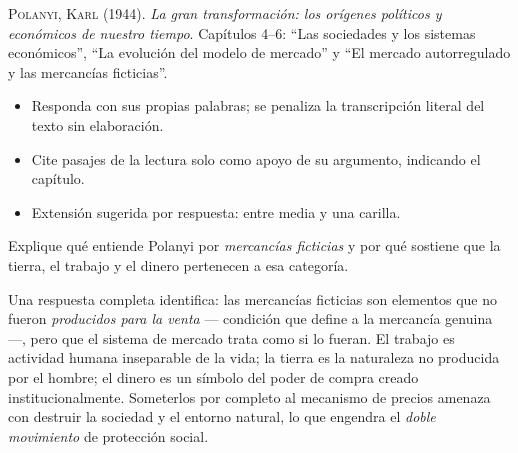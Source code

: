 \documentclass{evaluacion}
\begin{document}
\membrete

\begin{datos}
\textsc{Polanyi, Karl} (1944). \emph{La gran transformación: los orígenes
políticos y económicos de nuestro tiempo}. Capítulos 4--6:
\enquote{Las sociedades y los sistemas económicos}, \enquote{La evolución
del modelo de mercado} y \enquote{El mercado autorregulado y las
mercancías ficticias}.
\end{datos}

\begin{instrucciones}
\begin{itemize}
  \item Responda con sus propias palabras; se penaliza la transcripción
        literal del texto sin elaboración.
  \item Cite pasajes de la lectura solo como apoyo de su argumento,
        indicando el capítulo.
  \item Extensión sugerida por respuesta: entre media y una carilla.
\end{itemize}
\end{instrucciones}

\begin{pregunta}[4][Comprensión]
Explique qué entiende Polanyi por \emph{mercancías ficticias} y por qué
sostiene que la tierra, el trabajo y el dinero pertenecen a esa
categoría.
\begin{solucion}
Una respuesta completa identifica: las mercancías ficticias son elementos
que no fueron \emph{producidos para la venta} — condición que define a la
mercancía genuina —, pero que el sistema de mercado trata como si lo
fueran. El trabajo es actividad humana inseparable de la vida; la tierra
es la naturaleza no producida por el hombre; el dinero es un símbolo del
poder de compra creado institucionalmente. Someterlos por completo al
mecanismo de precios amenaza con destruir la sociedad y el entorno
natural, lo que engendra el \emph{doble movimiento} de protección social.
\end{solucion}
\end{pregunta}
\end{document}
